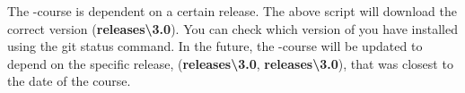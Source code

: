 The \Dumux-course is dependent on a certain \Dumux release. The above script will
download the correct version (\textbf{releases\textbackslash3.0}). You can check which version
of \Dumux you have installed using the git status command. In the future, the \Dumux-course
will be updated to depend on the specific release, (\textbf{releases\textbackslash3.0}, \textbf{releases\textbackslash3.0}),
that was closest to the date of the course.